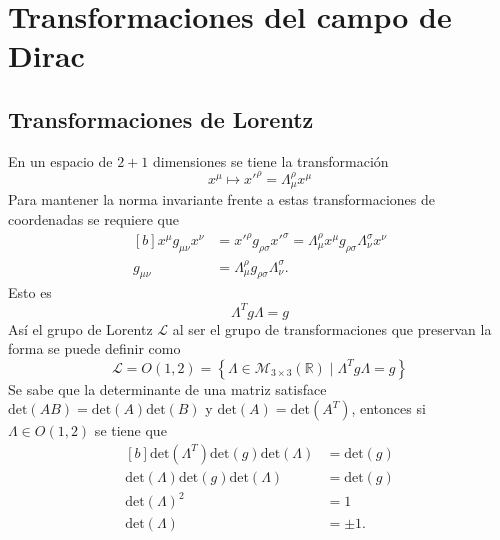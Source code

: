 \section{Transformaciones del campo de Dirac}
\subsection{Transformaciones de Lorentz}
En un espacio de $2+1$ dimensiones se tiene la transformación
\begin{equation}
	x^{\mu} \longmapsto x'^{\rho}=\Lambda^{\rho}_\mu x^{\mu}
\end{equation}
Para mantener la norma invariante frente a estas transformaciones de coordenadas se requiere que
\begin{equation}
	\begin{aligned}[b]
		x^{\mu}g_{\mu\nu}x^{\nu} & = x'^{\rho}g_{\rho\sigma}x'^{\sigma} = \Lambda^{\rho}_\mu x^{\mu}g_{\rho\sigma}\Lambda^{\sigma}_\nu x^{\nu} \\
		g_{\mu\nu}               & = \Lambda_\mu^{\rho}g_{\rho\sigma}\Lambda_\nu^{\sigma}.
	\end{aligned}\label{eq:lorentztrans1}
\end{equation}
Esto es
\begin{equation}
	\Lambda^{T}g\Lambda = g
\end{equation}
Así el grupo de Lorentz $\mathcal{L}$ al ser el grupo de transformaciones que preservan la forma se puede definir como
\begin{equation}
	\mathcal{L} = O(1,2) = \left\{\Lambda \in \mathcal{M}_{3\times3}(\mathbb{R})\mid \Lambda^{T}g\Lambda = g\right\}
\end{equation}
Se sabe que la determinante de una matriz satisface $\text{det}(AB) = \text{det}(A)\text{det}(B)$ y $\text{det}(A) = \text{det}(A^T)$, entonces si $\Lambda \in O(1,2)$ se tiene que
\begin{equation}
	\begin{aligned}[b]
		\text{det}(\Lambda^T) \text{det}(g) \text{det}(\Lambda) & = \text{det}(g) \\
		\text{det}(\Lambda) \text{det}(g) \text{det}(\Lambda)   & = \text{det}(g) \\
		\text{det}(\Lambda)^2                                   & = 1             \\
		\text{det}(\Lambda)                                     & = \pm 1.
	\end{aligned}
\end{equation}
